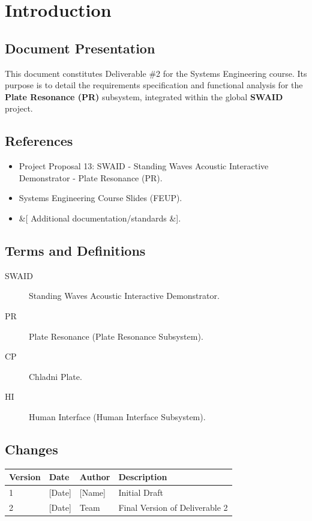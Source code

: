 \section{Introduction}

\subsection{Document Presentation}
This document constitutes Deliverable \#2 for the Systems Engineering course. Its purpose is to detail the requirements specification and functional analysis for the \textbf{Plate Resonance (PR)} subsystem, integrated within the global \textbf{SWAID} project.

\subsection{References}
\begin{itemize}
    \item Project Proposal 13: SWAID - Standing Waves Acoustic Interactive Demonstrator - Plate Resonance (PR).
    \item Systems Engineering Course Slides (FEUP).
    \item &[ Additional documentation/standards &].
\end{itemize}

\subsection{Terms and Definitions}
\begin{description}
    \item[SWAID] Standing Waves Acoustic Interactive Demonstrator.
    \item[PR] Plate Resonance (Plate Resonance Subsystem).
    \item[CP] Chladni Plate.
    \item[HI] Human Interface (Human Interface Subsystem).
\end{description}

\subsection{Changes}
\begin{table}[h]
    \centering
    \begin{tabular}{@{}llll@{}}
        \toprule
        \textbf{Version} & \textbf{Date} & \textbf{Author} & \textbf{Description} \\ \midrule
        1 & [Date] & [Name] & Initial Draft \\
        2 & [Date] & Team & Final Version of Deliverable 2 \\ \bottomrule
    \end{tabular}
\end{table}